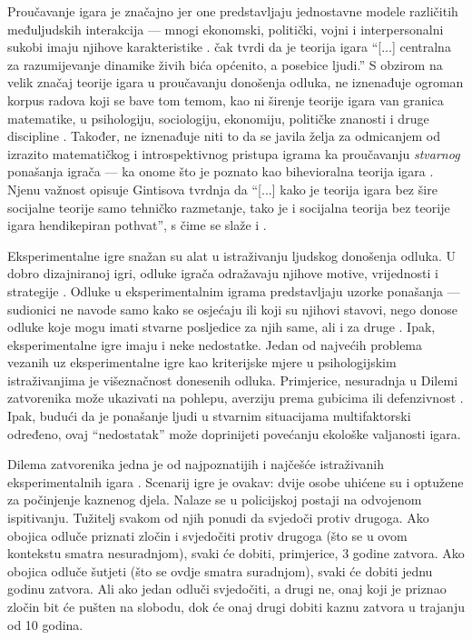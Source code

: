 \documentclass[a4paper, 12pt]{report}
\begin{document}
Proučavanje igara je značajno jer one predstavljaju jednostavne 
modele različitih međuljudskih interakcija
---  mnogi ekonomski, politički, vojni i
interpersonalni sukobi imaju  njihove karakteristike  \citep{worldexgame,colgt}. \citet[str. xiii]{gintbounds} čak
tvrdi da je teorija igara \enquote{[...] centralna za razumijevanje dinamike
    živih bića općenito, a posebice ljudi.} S obzirom na velik značaj teorije
igara u proučavanju donošenja odluka, ne iznenađuje ogroman korpus radova koji
se bave tom temom, kao ni širenje teorije igara van granica matematike, u
psihologiju, sociologiju, ekonomiju, političke znanosti i druge discipline
\citep{vlangsocrev}. Također, ne iznenađuje niti to da se javila želja za
odmicanjem od izrazito matematičkog i introspektivnog pristupa igrama ka
proučavanju \emph{stvarnog} ponašanja igrača --- ka onome što je poznato kao bihevioralna
teorija igara \citep{camerer2003}. Njenu važnost opisuje 
Gintisova \citeyearpar[str. xiii]{gintbounds}  tvrdnja da
\enquote{[...] kako je teorija igara bez šire socijalne teorije samo tehničko
    razmetanje, tako je i socijalna teorija bez teorije igara hendikepiran
    pothvat}, s čime se slaže i \citet[str. ix, par. 2]{colgt}. 

Eksperimentalne igre  snažan su alat u istraživanju ljudskog donošenja odluka. U
dobro dizajniranoj igri, odluke igrača odražavaju njihove motive, vrijednosti
i strategije \citep{worldexgame}. Odluke u eksperimentalnim igrama predstavljaju
uzorke ponašanja --- sudionici ne navode samo kako se osjećaju ili koji su
njihovi stavovi, nego donose odluke koje mogu imati stvarne posljedice za njih
same, ali i za druge \citep{worldexgame}. Ipak, eksperimentalne igre imaju i
neke nedostatke.
Jedan od najvećih problema vezanih uz eksperimentalne igre kao kriterijske mjere
u psihologijskim istraživanjima je višeznačnost donesenih odluka.
Primjerice, nesuradnja u Dilemi
zatvorenika može ukazivati na pohlepu, averziju prema gubicima ili defenzivnost
\citep{worldexgame, colgt}. Ipak, budući da je ponašanje ljudi u stvarnim
situacijama multifaktorski određeno, ovaj \enquote{nedostatak} može doprinijeti povećanju
ekološke valjanosti igara.

Dilema zatvorenika jedna je od najpoznatijih i najčešće istraživanih
eksperimentalnih igara \citep{colgt,
    van1998psychology, vancoop}. Scenarij
igre je ovakav: dvije osobe uhićene su i optužene za počinjenje kaznenog djela.
Nalaze se u policijskoj postaji na odvojenom ispitivanju. Tužitelj svakom od
njih ponudi da svjedoči protiv drugoga. Ako obojica odluče priznati zločin i
svjedočiti protiv drugoga (što se u ovom kontekstu smatra nesuradnjom), 
svaki će dobiti, primjerice, 3 godine zatvora. Ako
obojica odluče šutjeti (što se ovdje smatra suradnjom), 
svaki će dobiti jednu godinu zatvora. Ali ako jedan
odluči svjedočiti, a drugi ne, onaj koji je priznao zločin bit će pušten na slobodu, dok će
onaj drugi dobiti kaznu zatvora u trajanju od 10 godina.
\end{document}
